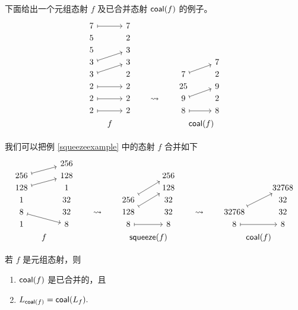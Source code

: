 \begin{example}
    下面给出一个元组态射 $f$ 及已合并态射 $\mathsf{coal}(f)$ 的例子。
    \[ \begin{tikzcd} [row sep = 1, column sep = 8]
    7 \ar[rr,mapsto] & & 7 & & & & & & \\
    5 & & 2 & & & & & & \\
    5 & & 3 & & & & & & \\
    3 \ar[urr,mapsto] & & 3 & & & & & & 7\\
    3 \ar[urr,mapsto] & & 2 & & & & 7 \ar[urr,mapsto] & & 2\\
    2 \ar[rr,mapsto] & & 2 & & & & 25 & & 9\\
    2 \ar[rr,mapsto] & & 2 & & \rightsquigarrow  & & 9 \ar[urr,mapsto] & & 2\\
    2 \ar[rr,mapsto] & & 2 & & & & 8 \ar[rr,mapsto] & & 8\\
    & f &  & & & & & \mathclap{\coalesce(f)} &\\
    \end{tikzcd} \]
\end{example}

\begin{example} 我们可以把例 \ref{squeezeexample} 中的态射 $f$ 合并如下
\[ \begin{tikzcd}[row sep = 1, column sep = 8]
 & & 256 & & & & & & \\
256 \ar[rru ,mapsto] & & 128   & & & & & & 256 \\
128 \ar[rru,mapsto] & & 1& & & & & & 128 & & & & & & 32768 \\
1 & & 32 & & & & 256 \ar[uurr,mapsto] & & 32 & & & & & & 32\\
8 \ar[drr,mapsto] & & 32 & & \rightsquigarrow & & 128 \ar[uurr,mapsto]  & & 32 & & \rightsquigarrow & & 32768 \ar[uurr,mapsto] & & 32\\
1 & & 8 & & & &  8 \ar[rr,mapsto] & & 8 & & & & 8 \ar[rr,mapsto] & & 8\\
& f & & & & & & \mathclap{\squeeze(f)} & & & & & & \mathclap{\coalesce(f)} &
\end{tikzcd} \]
\end{example}



\begin{proposition}\label{coalesceinCproposition}
    若 $f$ 是元组态射，则
    \begin{enumerate}
    \item $\mathsf{coal}(f)$ 是已合并的，且
    \item $ L_{\mathsf{coal}(f)} = \mathsf{coal}(L_f).$
    \end{enumerate}
\end{proposition}

